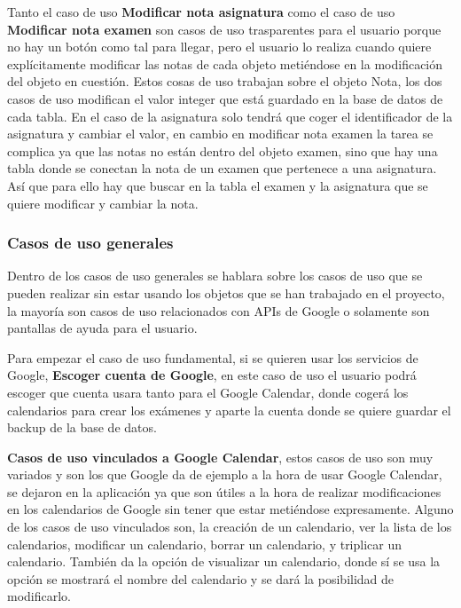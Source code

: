 Tanto el caso de uso \textbf{Modificar nota asignatura} como el caso de uso \textbf{Modificar nota examen} son casos de uso trasparentes para el usuario porque no hay un botón como tal para llegar, pero el usuario lo realiza cuando quiere explícitamente modificar las notas de cada objeto metiéndose en la modificación del objeto en cuestión.
Estos cosas de uso trabajan sobre el objeto Nota, los dos casos de uso modifican el valor integer que está guardado en la base de datos de cada tabla. En el caso de la asignatura solo tendrá que coger el identificador de la asignatura y cambiar el valor, en cambio en modificar nota examen la tarea se complica ya que las notas no están dentro del objeto examen, sino que hay una tabla donde se conectan la nota de un examen que pertenece a una asignatura. Así que para ello hay que buscar en la tabla el examen y la asignatura que se quiere modificar y cambiar la nota.

\subsubsection{Casos de uso generales}
\label{subsubsecc:Casos de uso generales}

Dentro de los casos de uso generales se hablara sobre los casos de uso que se pueden realizar sin estar usando los objetos que se han trabajado en el proyecto, la mayoría son casos de uso relacionados con APIs de Google o solamente son pantallas de ayuda para el usuario.

Para empezar el caso de uso fundamental, si se quieren usar los servicios de Google, \textbf{Escoger cuenta de Google}, en este caso de uso el usuario podrá escoger que cuenta usara tanto para el Google Calendar, donde cogerá los calendarios para crear los exámenes y aparte la cuenta donde se quiere guardar el backup de la base de datos.

\textbf{Casos de uso vinculados a Google Calendar}, estos casos de uso son muy variados y son los que Google da de ejemplo a la hora de usar Google Calendar, se dejaron en la aplicación ya que son útiles a la hora de realizar modificaciones en los calendarios de Google sin tener que estar metiéndose expresamente.
Alguno de los casos de uso vinculados son, la creación de un calendario, ver la lista de los calendarios, modificar un calendario, borrar un calendario, y triplicar un calendario. También da la opción de visualizar un calendario, donde sí se usa la opción se mostrará el nombre del calendario y se dará la posibilidad de modificarlo.

